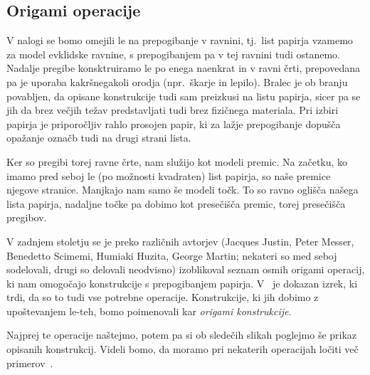 \subsection{Origami operacije}

V nalogi se bomo omejili le na prepogibanje v ravnini, tj.\ list papirja vzamemo za model evklidske ravnine, s prepogibanjem pa v tej ravnini tudi ostanemo. Nadalje pregibe konsktruiramo le po enega naenkrat in v ravni črti, prepovedana pa je uporaba kakršnegakoli orodja (npr.\ škarje in lepilo).  Bralec je ob branju povabljen, da opisane konstrukcije tudi sam preizkusi na listu papirja, sicer pa se jih da brez večjih težav predstavljati tudi brez fizičnega materiala. Pri izbiri papirja je priporočljiv rahlo prosojen papir, ki za lažje prepogibanje dopušča opažanje označb tudi na drugi strani lista.

Ker so pregibi torej ravne črte, nam služijo kot modeli premic. Na začetku, ko imamo pred seboj le (po možnosti kvadraten) list papirja, so naše premice njegove stranice. Manjkajo nam samo še modeli točk. To so ravno oglišča našega lista papirja, nadaljne točke pa dobimo kot presečišča premic, torej presečišča pregibov.

V zadnjem stoletju se je preko različnih avtorjev (Jacques Justin, Peter Messer, Benedetto Scimemi, Humiaki Huzita, George Martin; nekateri so med seboj sodelovali, drugi so delovali neodvisno) izoblikoval seznam osmih origami operacij, ki nam omogočajo konstrukcije s prepogibanjem papirja. V~\cite[str.\ 24--26]{hull2020} je dokazan izrek, ki trdi, da so to tudi vse potrebne operacije. Konstrukcije, ki jih dobimo z upoštevanjem le-teh, bomo poimenovali kar \emph{origami konstrukcije}.

Najprej te operacije naštejmo, potem pa si ob sledečih slikah poglejmo še prikaz opisanih konstrukcij. Videli bomo, da moramo pri nekaterih operacijah ločiti več primerov~\cite{michael2005, zore2022}.

\renewcommand{\theoperacija}{O\arabic{operacija}}

